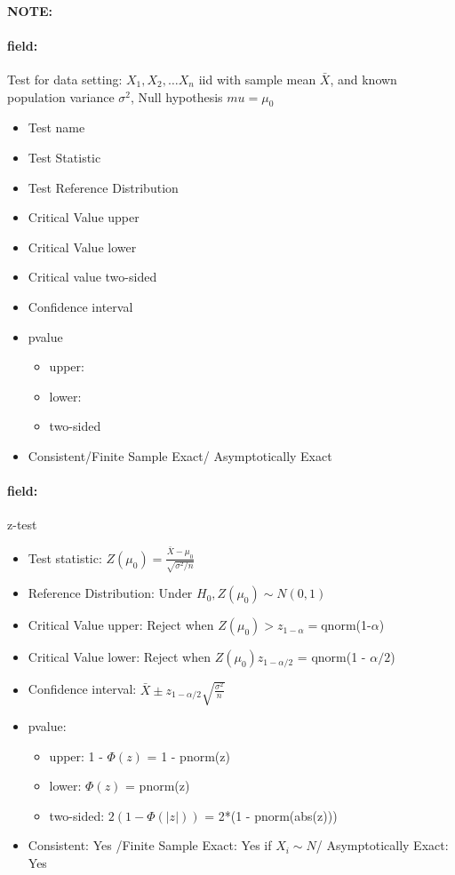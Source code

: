 \documentclass[12pt]{article}
\newenvironment{note}{\paragraph{NOTE:}}{}
\newenvironment{field}{\paragraph{field:}}{}
\begin{document}
\begin{note}
	\begin{field}
		Test for data setting: $X_1, X_2, \ldots X_n$ iid with sample mean $\bar{X}$, and known population variance $\sigma^2$, Null hypothesis $mu = \mu_0$

		\begin{itemize}
			\item Test name
			\item Test Statistic
			\item Test Reference Distribution
			\item Critical Value upper
			\item Critical Value lower
			\item Critical value two-sided
			\item Confidence interval
			\item pvalue
			      \begin{itemize}
				      \item upper:
				      \item lower:
				      \item two-sided
			      \end{itemize}
			\item Consistent/Finite Sample Exact/ Asymptotically Exact
		\end{itemize}
	\end{field}
	\begin{field}
		z-test
		\begin{itemize}
			\item Test statistic: $Z(\mu_0) = \frac{\bar{X} - \mu_0}{\sqrt{\sigma^2/n}}$
			\item Reference Distribution: Under $H_0, Z(\mu_0) \sim N(0,1)$
			\item Critical Value upper: Reject when $Z(\mu_0) > z_{1 - \alpha} = $qnorm(1-$\alpha$)
			\item Critical Value lower: Reject when $Z(\mu_0) z_{1 - \alpha/2}$ = qnorm(1 - $\alpha/2$)
			\item Confidence interval: $ \bar{X} \pm z_{1 - \alpha/2}\sqrt{\frac{\sigma^2}{n}}$
			\item pvalue:
			      \begin{itemize}
				      \item upper: 1 - $\Phi(z)$ = 1 - pnorm(z)
				      \item lower: $\Phi(z)$ = pnorm(z)
				      \item two-sided: $2(1 - \Phi(|z|))$ = 2*(1 - pnorm(abs(z)))
			      \end{itemize}
			\item Consistent: Yes /Finite Sample Exact: Yes if $X_i \sim N$/ Asymptotically Exact: Yes
		\end{itemize}
	\end{field}
\end{note}
\end{document}
